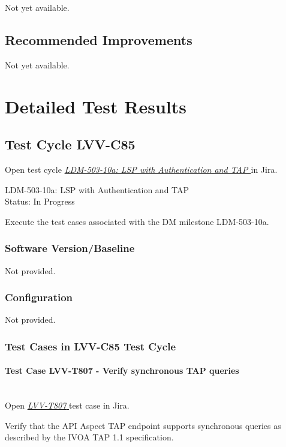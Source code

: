 \documentclass[DM,lsstdraft,STR,toc]{lsstdoc}
\begin{document}
Not yet available.

\subsection{Recommended Improvements}
\label{sect:recommendations}

Not yet available.

\newpage
\section{Detailed Test Results}
\label{sect:detailedtestresults}


  \subsection{Test Cycle LVV-C85 }

Open test cycle {\it \href{https://jira.lsstcorp.org/secure/Tests.jspa#/testrun/LVV-C85}{LDM-503-10a: LSP with Authentication and TAP
}} in Jira.

  LDM-503-10a: LSP with Authentication and TAP
\\
  Status: In Progress

  Execute the test cases associated with the DM milestone LDM-503-10a.


  \subsubsection{Software Version/Baseline}
    Not provided.

  \subsubsection{Configuration}
    Not provided.

  \subsubsection{Test Cases in LVV-C85 Test Cycle}


    \paragraph{Test Case LVV-T807 - Verify synchronous TAP queries
 }\mbox{}\\

Open  \href{https://jira.lsstcorp.org/secure/Tests.jspa#/testCase/LVV-T807}{\textit{ LVV-T807 } }
test case in Jira.

    Verify that the API Aspect TAP endpoint supports synchronous queries as
described by the IVOA TAP 1.1 specification. ~ ~
\end{document}
